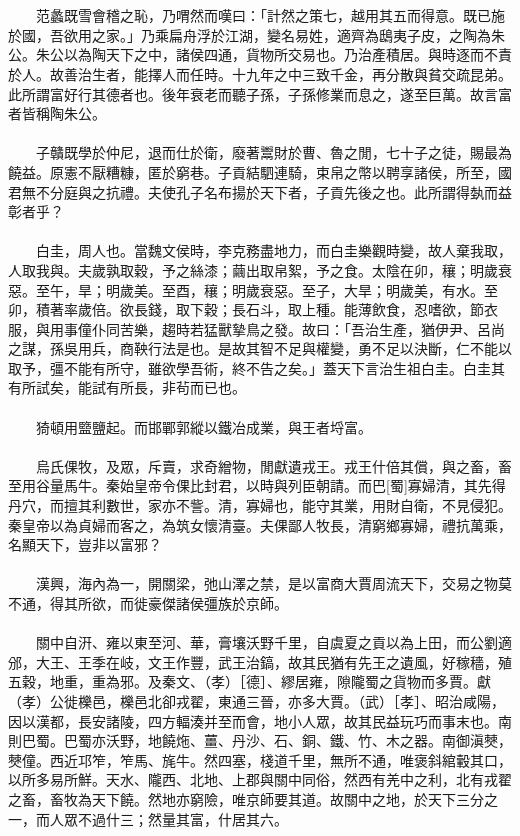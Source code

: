 \\\\
　　范蠡既雪會稽之恥，乃喟然而嘆曰：「計然之策七，越用其五而得意。既已施於國，吾欲用之家。」乃乘扁舟浮於江湖，變名易姓，適齊為鴟夷子皮，之陶為朱公。朱公以為陶天下之中，諸侯四通，貨物所交易也。乃治產積居。與時逐而不責於人。故善治生者，能擇人而任時。十九年之中三致千金，再分散與貧交疏昆弟。此所謂富好行其德者也。後年衰老而聽子孫，子孫修業而息之，遂至巨萬。故言富者皆稱陶朱公。
\\\\
　　子贛既學於仲尼，退而仕於衛，廢著鬻財於曹、魯之閒，七十子之徒，賜最為饒益。原憲不厭糟糠，匿於窮巷。子貢結駟連騎，束帛之幣以聘享諸侯，所至，國君無不分庭與之抗禮。夫使孔子名布揚於天下者，子貢先後之也。此所謂得埶而益彰者乎？
\\\\
　　白圭，周人也。當魏文侯時，李克務盡地力，而白圭樂觀時變，故人棄我取，人取我與。夫歲孰取穀，予之絲漆；繭出取帛絮，予之食。太陰在卯，穰；明歲衰惡。至午，旱；明歲美。至酉，穰；明歲衰惡。至子，大旱；明歲美，有水。至卯，積著率歲倍。欲長錢，取下穀；長石斗，取上種。能薄飲食，忍嗜欲，節衣服，與用事僮仆同苦樂，趨時若猛獸摯鳥之發。故曰：「吾治生產，猶伊尹、呂尚之謀，孫吳用兵，商鞅行法是也。是故其智不足與權變，勇不足以決斷，仁不能以取予，彊不能有所守，雖欲學吾術，終不告之矣。」蓋天下言治生祖白圭。白圭其有所試矣，能試有所長，非茍而已也。
\\\\
　　猗頓用盬鹽起。而邯鄲郭縱以鐵冶成業，與王者埒富。
\\\\
　　烏氏倮牧，及眾，斥賣，求奇繒物，閒獻遺戎王。戎王什倍其償，與之畜，畜至用谷量馬牛。秦始皇帝令倮比封君，以時與列臣朝請。而巴[蜀]寡婦清，其先得丹穴，而擅其利數世，家亦不訾。清，寡婦也，能守其業，用財自衛，不見侵犯。秦皇帝以為貞婦而客之，為筑女懷清臺。夫倮鄙人牧長，清窮鄉寡婦，禮抗萬乘，名顯天下，豈非以富邪？
\\\\
　　漢興，海內為一，開關梁，弛山澤之禁，是以富商大賈周流天下，交易之物莫不通，得其所欲，而徙豪傑諸侯彊族於京師。
\\\\
　　關中自汧、雍以東至河、華，膏壤沃野千里，自虞夏之貢以為上田，而公劉適邠，大王、王季在岐，文王作豐，武王治鎬，故其民猶有先王之遺風，好稼穡，殖五穀，地重，重為邪。及秦文、（孝）［德］、繆居雍，隙隴蜀之貨物而多賈。獻（孝）公徙櫟邑，櫟邑北卻戎翟，東通三晉，亦多大賈。（武）［孝］、昭治咸陽，因以漢都，長安諸陵，四方輻湊并至而會，地小人眾，故其民益玩巧而事末也。南則巴蜀。巴蜀亦沃野，地饒炧、薑、丹沙、石、銅、鐵、竹、木之器。南御滇僰，僰僮。西近邛笮，笮馬、旄牛。然四塞，棧道千里，無所不通，唯褒斜綰轂其口，以所多易所鮮。天水、隴西、北地、上郡與關中同俗，然西有羌中之利，北有戎翟之畜，畜牧為天下饒。然地亦窮險，唯京師要其道。故關中之地，於天下三分之一，而人眾不過什三；然量其富，什居其六。
